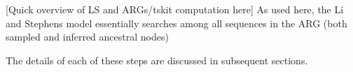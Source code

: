 \documentclass{article}
\begin{document}
[Quick overview of LS and ARGs/tskit computation here]
As used here, the Li and Stephens model essentially searches among
all sequences in the ARG (both sampled and inferred ancestral nodes)

The details of each of these steps are discussed in subsequent
sections.


\end{document}
